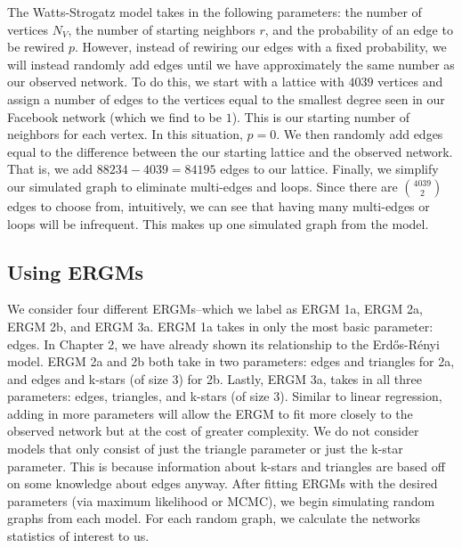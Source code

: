 \documentclass[12pt,twoside]{amherstthesis}
\begin{document}
  The Watts-Strogatz model takes in the following parameters: the number
  of vertices \(N_{V}\), the number of starting neighbors \(r\), and the
  probability of an edge to be rewired \(p\). However, instead of rewiring
  our edges with a fixed probability, we will instead randomly add edges
  until we have approximately the same number as our observed network. To
  do this, we start with a lattice with \(4039\) vertices and assign a
  number of edges to the vertices equal to the smallest degree seen in our
  Facebook network (which we find to be \(1\)). This is our starting
  number of neighbors for each vertex. In this situation, \(p = 0\). We
  then randomly add edges equal to the difference between the our starting
  lattice and the observed network. That is, we add
  \(88234 - 4039 = 84195\) edges to our lattice. Finally, we simplify our
  simulated graph to eliminate multi-edges and loops. Since there are
  \(4039 \choose 2\) edges to choose from, intuitively, we can see that
  having many multi-edges or loops will be infrequent. This makes up one
  simulated graph from the model.
  
  \subsection{Using ERGMs}\label{using-ergms}
  
  We consider four different ERGMs--which we label as ERGM 1a, ERGM 2a,
  ERGM 2b, and ERGM 3a. ERGM 1a takes in only the most basic parameter:
  edges. In Chapter 2, we have already shown its relationship to the
  Erdős-Rényi model. ERGM 2a and 2b both take in two parameters: edges and
  triangles for 2a, and edges and k-stars (of size 3) for 2b. Lastly, ERGM
  3a, takes in all three parameters: edges, triangles, and k-stars (of
  size 3). Similar to linear regression, adding in more parameters will
  allow the ERGM to fit more closely to the observed network but at the
  cost of greater complexity. We do not consider models that only consist
  of just the triangle parameter or just the k-star parameter. This is
  because information about k-stars and triangles are based off on some
  knowledge about edges anyway. After fitting ERGMs with the desired
  parameters (via maximum likelihood or MCMC), we begin simulating random
  graphs from each model. For each random graph, we calculate the networks
  statistics of interest to us.
  
  \clearpage
  
\end{document}
